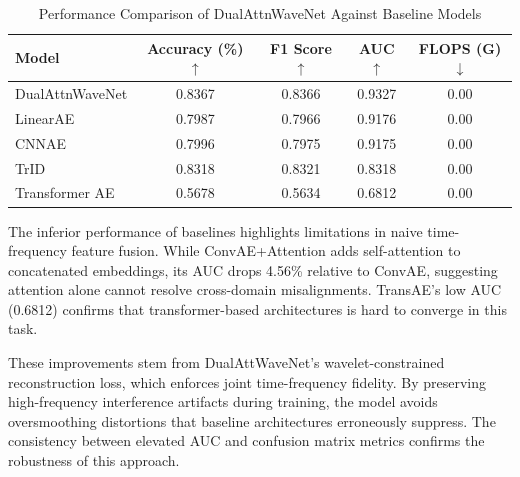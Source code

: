 \documentclass[10pt,twocolumn]{article}
\begin{document}
\begin{table}[htbp]
    \caption{Performance Comparison of DualAttnWaveNet Against Baseline Models}
    \label{tab:main_results}
    \centering
    \begin{tabular}{lcccc}
        \toprule
        \textbf{Model}  & \textbf{Accuracy (\%) } $\uparrow$ & \textbf{F1 Score} $\uparrow$ & \textbf{AUC}$\uparrow$ & \textbf{FLOPS (G)}$\downarrow$ \\
        \midrule
        DualAttnWaveNet & 0.8367                             & 0.8366                       & 0.9327                 & 0.00                           \\
        \cmidrule{1-5}
        LinearAE        & 0.7987                             & 0.7966                       & 0.9176                 & 0.00                           \\
        CNNAE           & 0.7996                             & 0.7975                       & 0.9175                 & 0.00                           \\
        TrID            & 0.8318                             & 0.8321                       & 0.8318                 & 0.00                           \\
        Transformer AE  & 0.5678                             & 0.5634                       & 0.6812                 & 0.00                           \\
        \bottomrule
    \end{tabular}
\end{table}

The inferior performance of baselines highlights limitations in naive time-frequency feature fusion. While ConvAE+Attention adds self-attention to concatenated embeddings, its AUC drops 4.56\% relative to ConvAE, suggesting attention alone cannot resolve cross-domain misalignments. TransAE’s low AUC (0.6812) confirms that transformer-based architectures is hard to converge in this task.



These improvements stem from DualAttWaveNet’s wavelet-constrained reconstruction loss, which enforces joint time-frequency fidelity. By preserving high-frequency interference artifacts during training, the model avoids oversmoothing distortions that baseline architectures erroneously suppress. The consistency between elevated AUC and confusion matrix metrics confirms the robustness of this approach.
\end{document}
